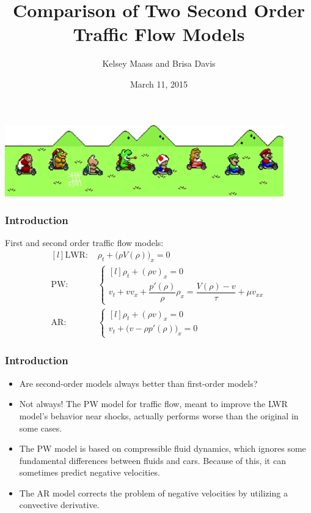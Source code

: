 \documentclass{beamer}
\title[Short title]{Comparison of Two Second Order Traffic Flow Models} %
\author{Kelsey Maass and Brisa Davis} %
\institute[UW] %
{
AMATH 574 \\ %
Group 6
\medskip
}
\date{March 11, 2015} %
\begin{document}
\begin{frame}
\titlepage %
\includegraphics[width=4.75in]{mariokart.png}
\end{frame}

\begin{frame}
\frametitle{Introduction}
\hspace{4.75em} First and second order traffic flow models: \\[3ex]

\[ \begin{matrix*}[l]
\text{LWR: } & \rho_t + \Big(\rho V(\rho)\Big)_x = 0 \\[4ex]

\text{PW: } & \left\{ \begin{matrix*}[l] \rho_t + (\rho v)_x = 0 \\[1ex] v_t + v v_x + \dfrac{p'(\rho)}{\rho} \rho_x = \dfrac{V(\rho) - v}{\tau} + \mu v_{xx} \end{matrix*} \right. \\[6ex]

\text{AR: } &  \left\{ \begin{matrix*}[l] \rho_t + (\rho v)_x = 0 \\[1ex] v_t + \Big( v - \rho p'(\rho) \Big)_x = 0 \end{matrix*} \right.
\end{matrix*} \]



\end{frame}

\begin{frame}
\frametitle{Introduction} 
\begin{itemize}
\item Are second-order models always better than first-order models?
\item Not always! The PW model for traffic flow, meant to improve the LWR model's behavior near shocks, actually performs worse than the original in some cases.
\item The PW model is based on compressible fluid dynamics, which ignores some fundamental differences between fluids and cars. Because of this, it can sometimes predict negative velocities.
\item The AR model corrects the problem of negative velocities by utilizing a convective derivative.
\end{itemize}
\end{frame}
\end{document}
